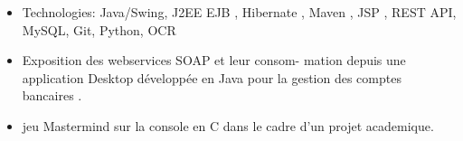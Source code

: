 \documentclass[10pt,a4paper]{altacv}
\begin{document}
 {}
\begin{itemize}
	\item Technologies: Java/Swing, J2EE EJB , Hibernate , Maven , JSP , REST API, MySQL, Git, Python, OCR 
\end{itemize}
 {}
\begin{itemize}
	\item Exposition des webservices SOAP et leur consom- mation depuis une application Desktop développée en Java pour la gestion des comptes bancaires . 
\end{itemize}
 {}
\begin{itemize}
	\item jeu Mastermind sur la console en C dans le cadre d’un projet academique. 
\end{itemize}
\end{document}
